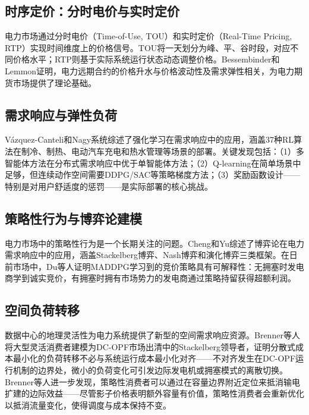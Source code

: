 \documentclass[11pt,twocolumn]{article}
\begin{document}
\subsection{时序定价：分时电价与实时定价}

电力市场通过分时电价（Time-of-Use, TOU）和实时定价（Real-Time Pricing, RTP）实现时间维度上的价格信号。TOU将一天划分为峰、平、谷时段，对应不同价格水平；RTP则基于实际系统运行状态动态调整价格。Bessembinder和Lemmon\cite{bessembinder2002equilibrium}证明，电力远期合约的价格升水与价格波动性及需求弹性相关，为电力期货市场提供了理论基础。

\subsection{需求响应与弹性负荷}

V\'azquez-Canteli和Nagy\cite{vazquez2019reinforcement}系统综述了强化学习在需求响应中的应用，涵盖37种RL算法在制冷、制热、电动汽车充电和热水管理等场景的部署。关键发现包括：（1）多智能体方法在分布式需求响应中优于单智能体方法；（2）Q-learning在简单场景中足够，但连续动作空间需要DDPG/SAC等策略梯度方法；（3）奖励函数设计——特别是对用户舒适度的惩罚——是实际部署的核心挑战。

\subsection{策略性行为与博弈论建模}

电力市场中的策略性行为是一个长期关注的问题。Cheng和Yu\cite{cheng2019game}综述了博弈论在电力需求响应中的应用，涵盖Stackelberg博弈、Nash博弈和演化博弈三类框架。在日前市场中，Du等人\cite{du2021approximating}证明MADDPG学习到的竞价策略具有可解释性：无拥塞时发电商学到诚实竞价，有拥塞时拥有市场势力的发电商通过策略持留获得超额利润。

\subsection{空间负荷转移}

数据中心的地理灵活性为电力系统提供了新型的空间需求响应资源。Brenner等人\cite{brenner2026spatial}将大型灵活消费者建模为DC-OPF市场出清中的Stackelberg领导者，证明分散式成本最小化的负荷转移不必与系统运行成本最小化对齐——不对齐发生在DC-OPF运行机制的边界处，微小的负荷变化可引发边际发电机或拥塞模式的离散切换。Brenner等人\cite{brenner2025strategic}进一步发现，策略性消费者可以通过在容量边界附近定位来抵消输电扩建的边际效益——尽管影子价格表明额外容量有价值，策略性消费者会重新优化以抵消流量变化，使得调度与成本保持不变。
\end{document}
